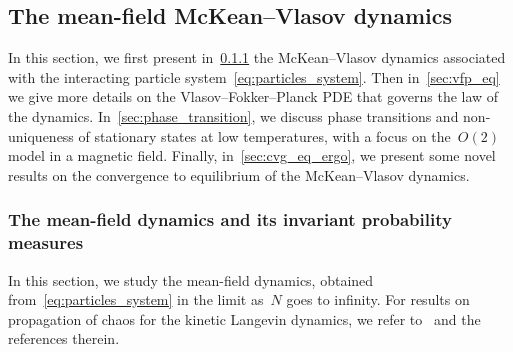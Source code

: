 \documentclass[onefignum,onetabnum]{siamart251216} %
\theoremstyle{plain}
\numberwithin{equation}{section}
\numberwithin{theorem}{section}
\begin{document}
\subsection{The mean-field McKean--Vlasov dynamics}
\label{sec:mean_field_eq}
In this section, we first present in~\cref{sec:inv_measure_of_McKean-Vlasov} the McKean--Vlasov dynamics associated with the interacting particle system~\eqref{eq:particles_system}.
Then in~\cref{sec:vfp_eq} we give more details on the Vlasov--Fokker--Planck PDE that governs the law of the dynamics.
In~\cref{sec:phase_transition},
we discuss phase transitions and non-uniqueness of stationary states at low temperatures, with a focus on the~$O(2)$ model in a magnetic field.
Finally, in~\cref{sec:cvg_eq_ergo}, we present some novel results on the convergence to equilibrium of the McKean--Vlasov dynamics.
%
%
\subsubsection{The mean-field dynamics and its invariant probability measures}
\label{sec:inv_measure_of_McKean-Vlasov}
In this section, we study the mean-field dynamics, obtained from~\eqref{eq:particles_system} in the limit as~$N$ goes to infinity. For results on propagation of chaos for the kinetic Langevin dynamics, we refer to~\cite{GLWZ2021, guillin2021uniform} and the references therein.
\end{document}
